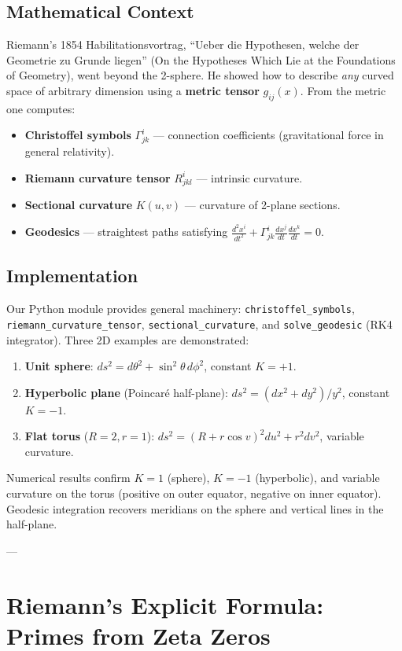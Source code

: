 \documentclass[11pt]{amsart}
\theoremstyle{definition}
\begin{document}
\subsection{Mathematical Context}
Riemann's 1854 Habilitationsvortrag, ``Ueber die Hypothesen, welche der Geometrie zu Grunde liegen'' (On the Hypotheses Which Lie at the Foundations of Geometry), went beyond the 2-sphere. He showed how to describe \textit{any} curved space of arbitrary dimension using a \textbf{metric tensor} $g_{ij}(x)$. From the metric one computes:
\begin{itemize}
    \item \textbf{Christoffel symbols} $\Gamma^i_{jk}$ --- connection coefficients (gravitational force in general relativity).
    \item \textbf{Riemann curvature tensor} $R^i_{jkl}$ --- intrinsic curvature.
    \item \textbf{Sectional curvature} $K(u,v)$ --- curvature of 2-plane sections.
    \item \textbf{Geodesics} --- straightest paths satisfying $\frac{d^2 x^i}{dt^2} + \Gamma^i_{jk} \frac{dx^j}{dt} \frac{dx^k}{dt} = 0$.
\end{itemize}

\subsection{Implementation}
Our Python module provides general machinery: \texttt{christoffel\_symbols}, \texttt{riemann\_curvature\_tensor}, \texttt{sectional\_curvature}, and \texttt{solve\_geodesic} (RK4 integrator). Three 2D examples are demonstrated:
\begin{enumerate}
    \item \textbf{Unit sphere}: $ds^2 = d\theta^2 + \sin^2\theta\, d\phi^2$, constant $K=+1$.
    \item \textbf{Hyperbolic plane} (Poincar\'e half-plane): $ds^2 = (dx^2+dy^2)/y^2$, constant $K=-1$.
    \item \textbf{Flat torus} ($R=2, r=1$): $ds^2 = (R+r\cos v)^2 du^2 + r^2 dv^2$, variable curvature.
\end{enumerate}
Numerical results confirm $K=1$ (sphere), $K=-1$ (hyperbolic), and variable curvature on the torus (positive on outer equator, negative on inner equator). Geodesic integration recovers meridians on the sphere and vertical lines in the half-plane.

---

\section{Riemann's Explicit Formula: Primes from Zeta Zeros}
\label{sec:explicit}
\end{document}
